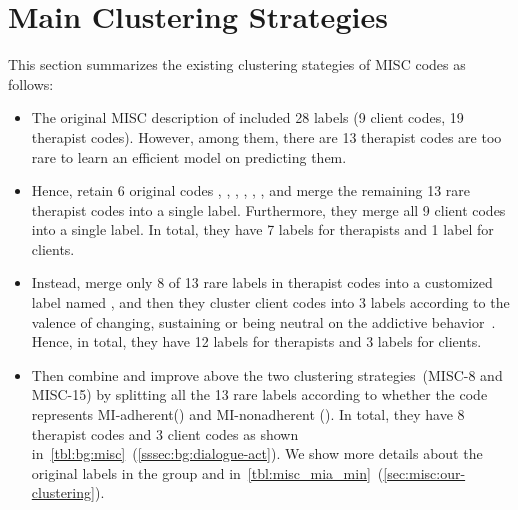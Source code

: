 \section{Main Clustering Strategies}
\label{sec:misc:other-clustering}
This section summarizes the existing clustering stategies of MISC
codes as follows:
\begin{itemize}
\item {} The original MISC description of
  \citet{miller2003manual} included 28 labels (9 client codes, 19
  therapist codes). However, among them, there are 13 therapist codes
  are too rare to learn an efficient model on predicting them.

\item {} Hence, \citet{can2015dialog} retain 6 original
  codes \FA, \GI, \QUC, \QUO, \REC, \RES, and merge the remaining 13
  rare therapist codes into a single  label.  Furthermore,
  they merge all 9 client codes into a single  label. In
  total, they have 7 labels for therapists and 1 label for clients.

\item {} Instead, \citet{tanana2016comparison} merge only 8
  of 13 rare labels in therapist codes into a customized label named
  , and then they cluster client codes into 3 labels
  according to the valence of changing, sustaining or being neutral on
  the addictive behavior~\cite{atkins2014scaling}. Hence, in total,
  they have 12 labels for therapists and 3 labels for clients.

\item {} Then \citet{xiao2016behavioral} combine and
  improve above the two clustering strategies~(MISC-8 and MISC-15) by
  splitting all the 13 rare labels according to whether the code
  represents MI-adherent(\MIA) and MI-nonadherent (\MIN). In total,
  they have 8 therapist codes and 3 client codes as shown
  in~\autoref{tbl:bg:misc}~(\autoref{sssec:bg:dialogue-act}). We show
  more details about the original labels in the group \MIA and \MIN
  in~\autoref{tbl:misc_mia_min}~(\autoref{sec:misc:our-clustering}).
\end{itemize}

